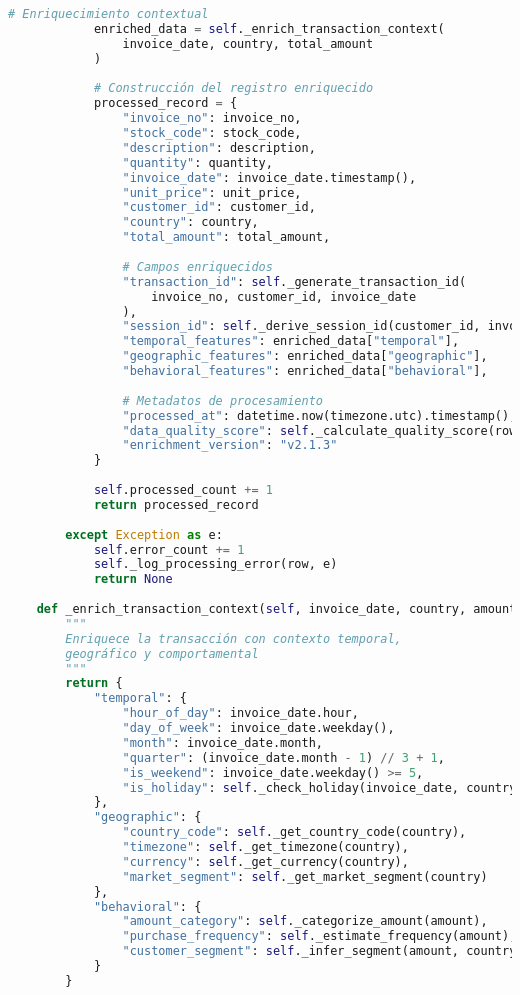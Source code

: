 \begin{lstlisting}[language=python, caption=Lógica de Procesamiento y Enriquecimiento de Transacciones, label=lst:data_processing]
            # Enriquecimiento contextual
            enriched_data = self._enrich_transaction_context(
                invoice_date, country, total_amount
            )
            
            # Construcción del registro enriquecido
            processed_record = {
                "invoice_no": invoice_no,
                "stock_code": stock_code,
                "description": description,
                "quantity": quantity,
                "invoice_date": invoice_date.timestamp(),
                "unit_price": unit_price,
                "customer_id": customer_id,
                "country": country,
                "total_amount": total_amount,
                
                # Campos enriquecidos
                "transaction_id": self._generate_transaction_id(
                    invoice_no, customer_id, invoice_date
                ),
                "session_id": self._derive_session_id(customer_id, invoice_date),
                "temporal_features": enriched_data["temporal"],
                "geographic_features": enriched_data["geographic"],
                "behavioral_features": enriched_data["behavioral"],
                
                # Metadatos de procesamiento
                "processed_at": datetime.now(timezone.utc).timestamp(),
                "data_quality_score": self._calculate_quality_score(row),
                "enrichment_version": "v2.1.3"
            }
            
            self.processed_count += 1
            return processed_record
            
        except Exception as e:
            self.error_count += 1
            self._log_processing_error(row, e)
            return None
    
    def _enrich_transaction_context(self, invoice_date, country, amount):
        """
        Enriquece la transacción con contexto temporal, 
        geográfico y comportamental
        """
        return {
            "temporal": {
                "hour_of_day": invoice_date.hour,
                "day_of_week": invoice_date.weekday(),
                "month": invoice_date.month,
                "quarter": (invoice_date.month - 1) // 3 + 1,
                "is_weekend": invoice_date.weekday() >= 5,
                "is_holiday": self._check_holiday(invoice_date, country)
            },
            "geographic": {
                "country_code": self._get_country_code(country),
                "timezone": self._get_timezone(country),
                "currency": self._get_currency(country),
                "market_segment": self._get_market_segment(country)
            },
            "behavioral": {
                "amount_category": self._categorize_amount(amount),
                "purchase_frequency": self._estimate_frequency(amount),
                "customer_segment": self._infer_segment(amount, country)
            }
        }
\end{lstlisting}

